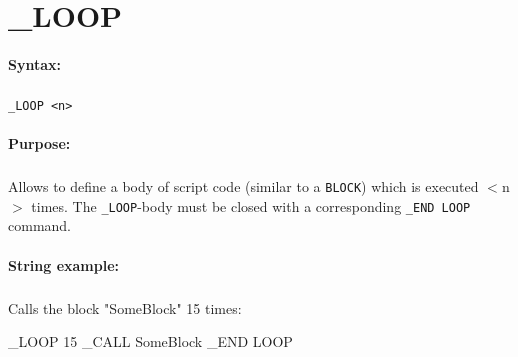 
\newpage
\section{\_LOOP}
\label{cmd:_LOOP}

\paragraph{Syntax:}
\subparagraph{}
\texttt{\_LOOP <n>}

\paragraph{Purpose:}
\subparagraph{}
Allows to define a body of script code (similar to a \texttt{BLOCK}) which 
is executed $<$n$>$ times. The \texttt{\_LOOP}-body must be closed with a 
corresponding \texttt{\_END LOOP} command.

\paragraph{String example:}
\subparagraph{}
Calls the block "SomeBlock" 15 times:

\begin{usplisting}
    _LOOP 15
    _CALL SomeBlock
    _END LOOP
\end{usplisting}
